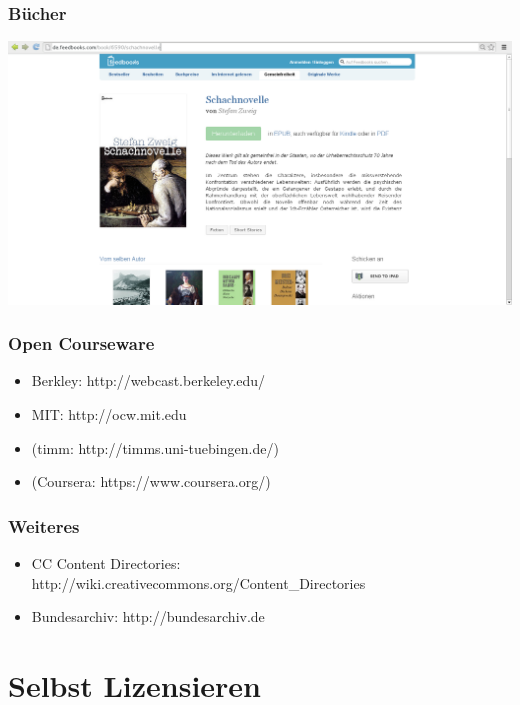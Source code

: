 \documentclass[table]{beamer}
\begin{document}
\begin{frame}
  \frametitle{Bücher}
  \includegraphics[width=\textwidth]{img/feedbooks.png}
\end{frame}

\begin{frame}
    \frametitle{Open Courseware}
      \begin{itemize}
        \item<2-> Berkley: http://webcast.berkeley.edu/
        \item<3-> MIT: http://ocw.mit.edu
        \item<4-> (timm: http://timms.uni-tuebingen.de/)
        \item<5-> (Coursera: https://www.coursera.org/)
    \end{itemize}
\end{frame}

\begin{frame}
    \frametitle{Weiteres}
      \begin{itemize}
        \item<1-> CC Content Directories: http://wiki.creativecommons.org/Content\_Directories
        \item<2-> Bundesarchiv: http://bundesarchiv.de
      \end{itemize}
\end{frame}

\section{Selbst Lizensieren}
\subsection{}
\end{document}
